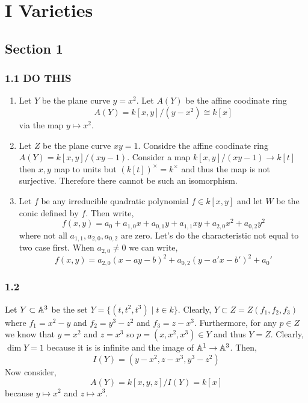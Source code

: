 \documentclass[12pt]{article}
\begin{document}
\tableofcontents

\newpage

\section{I Varieties}

\subsection{Section 1}

\subsubsection{1.1 DO THIS}

\begin{enumerate}
\item Let $Y$ be the plane curve $y = x^2$. Let $A(Y)$ be the affine coodinate ring 
\[ A(Y) = k[x,y]/(y - x^2) \cong k[x] \]
 via the map $y \mapsto x^2$.

\item Let $Z$ be the plane curve $xy = 1$. Considre the affine coodinate ring $A(Y) = k[x,y]/(xy - 1)$. Consider a map $k[x,y]/(xy - 1) \to k[t]$ then $x, y$ map to units but $(k[t])^\times = k^\times$ and thus the map is not surjective. Therefore there cannot be such an isomorphism.

\item Let $f$ be any irreducible quadratic polynomial $f \in k[x,y]$ and let $W$ be the conic defined by $f$. Then write,
\[ f(x,y) = a_0 + a_{1,0} x + a_{0,1} y + a_{1,1} xy + a_{2,0} x^2 + a_{0,2} y^2 \]
where not all $a_{1,1}, a_{2,0}, a_{0,2}$ are zero. Let's do the characteristic not equal to two case first. When $a_{2,0} \neq 0$ we can write,
\[ f(x,y) = a_{2,0} (x - ay - b)^2 + a_{0,2} (y - a' x - b')^2 + a_0' \] 

\end{enumerate}

\subsubsection{1.2}

Let $Y \subset \mathbb{A}^3$ be the set $Y = \{(t, t^2, t^3) \mid t \in k \}$. Clearly, $Y \subset Z = Z(f_1, f_2, f_3)$ where $f_1 = x^2 - y$ and $f_2 = y^3 - z^2$ and $f_3 = z - x^3$. Furthermore, for any $p \in Z$ we know that $y = x^2$ and $z = x^3$ so $p = (x, x^2, x^3) \in Y$ and thus $Y = Z$. Clearly, $\dim{Y} = 1$ because it is is infinite and the image of $\mathbb{A}^1 \to \mathbb{A}^3$. Then,
\[ I(Y) = (y - x^2, z - x^3, y^3 - z^2) \]
Now consider,
\[ A(Y) = k[x,y,z]/I(Y) = k[x] \]
because $y \mapsto x^2$ and $z \mapsto x^3$. 
\end{document}
